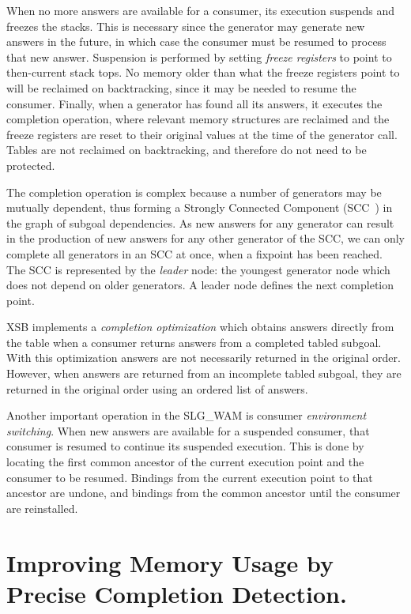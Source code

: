 \documentclass{./tlp}
\newcommand{\redsect}{\vspace{-1em}}
\begin{document}
When no more answers are available for a consumer, its execution
suspends and freezes the stacks.  This is necessary since the
generator may generate new answers in the future, in which case the
consumer must be resumed to process that new answer.  Suspension is
performed by setting \emph{freeze registers} to point to then-current
stack tops.  No memory older than what the freeze registers point to
will be reclaimed on backtracking, since it may be needed to resume
the consumer.  Finally, when a generator has found all its answers, it
executes the completion operation, where relevant memory structures
are reclaimed and the freeze registers are reset to their original
values at the time of the generator call.  Tables are not reclaimed on
backtracking, and therefore do not need to be protected.

The completion operation is complex because a number of generators may
be mutually dependent, thus forming a Strongly Connected Component
(SCC~\cite{tarjan72}) in the graph of subgoal dependencies.  As new
answers for any generator can result in the production of new answers
for any other generator of the SCC, we can only complete all
generators in an SCC at once, when a fixpoint has been reached.  The
SCC is represented by the \emph{leader} node: the youngest generator
node which does not depend on older generators.  A leader node defines
the next completion point.

XSB implements a \emph{completion optimization} which obtains answers
directly from the table when a consumer returns answers from a
completed tabled subgoal.  With this optimization answers are not
necessarily returned in the original order. However, when answers are returned
from an incomplete tabled subgoal, they are returned in the original
order using an ordered list of answers.

Another important operation in the SLG\_WAM is consumer \emph{environment switching}.
When new answers are available for a suspended consumer, that consumer
is resumed to continue its suspended execution.  This is done by locating
the first common ancestor of the current execution point and the consumer to
be resumed.  Bindings from the current execution point to that ancestor
are undone, and bindings from the common ancestor until the consumer
are reinstalled.  


\redsect
\section{Improving Memory Usage by Precise Completion Detection.}
\label{sec:ASCC} 
\end{document}
